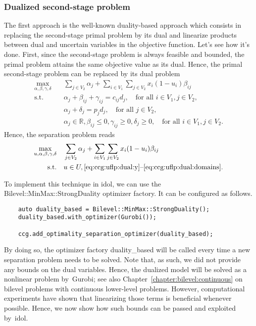 \subsubsection{Dualized second-stage problem}

The first approach is the well-known duality-based approach which consists in
replacing the second-stage primal problem by its dual and linearize products
between dual and uncertain variables in the objective function. Let's see how
it's done. First, since the second-stage problem is always feasible and
bounded, the primal problem attains the same objective value as its dual.
Hence, the primal second-stage problem can be replaced by its dual problem
% 
\begin{subequations}
    \begin{align}
        \max_{\alpha,\beta,\gamma,\delta} \quad & \sum_{ j\in V_2 } \alpha_j + \sum_{i\in V_1} \sum_{j\in V_2} x_i(1 - u_i) \beta_{ij} \\
        \text{s.t.} \quad & \alpha_j + \beta_{ij} + \gamma_{ij} = c_{ij}d_j, \quad \text{for all }i\in V_1, j\in V_2,
        \label{eq:ccg:uflp:dual:y} \\
        & \alpha_j + \delta_j = p_jd_j, \quad\text{for all } j\in V_2, \\
        & \alpha_j\in\mathbb{R}, \beta_{ij} \le 0, \gamma_{ij} \ge 0, \delta_j \ge 0, \quad \text{for all } i\in V_1, j\in V_2.
        \label{eq:ccg:uflp:dual:domains}
    \end{align}
\end{subequations}
Hence, the separation problem reads 
\begin{align*}
    \max_{u,\alpha,\beta,\gamma,\delta} \quad & \sum_{ j\in V_2 } \alpha_j + \sum_{i\in V_1} \sum_{j\in V_2} x_i(1 - u_i)\beta_{ij} \\
    \text{s.t.} \quad & u\in U, \text{\eqref{eq:ccg:uflp:dual:y}--\eqref{eq:ccg:uflp:dual:domains}}.
\end{align*}

To implement this technique in \textsf{idol}, we can use the
\textsf{Bilevel::MinMax::StrongDuality} optimizer factory. It can be
configured as follows.
%
\begin{lstlisting}
    auto duality_based = Bilevel::MinMax::StrongDuality();
    duality_based.with_optimizer(Gurobi());

    ccg.add_optimality_separation_optimizer(duality_based);
\end{lstlisting}

By doing so, the optimizer factory \textsf{duality\_based} will be called
every time a new separation problem needs to be solved. Note that, as such, we
did not provide any bounds on the dual variables. Hence, the dualized model
will be solved as a nonlinear problem by~\textsf{Gurobi}; see also
Chapter~\ref{chapter:bilevel:continuous} on bilevel problems with continuous
lower-level problems. However, computational experiments have shown that
linearizing those terms is beneficial whenever possible. Hence, we now show
how such bounds can be passed and exploited by~\textsf{idol}.

